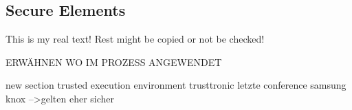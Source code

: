 \subsection{Secure Elements}\label{subsection:external-secure}
This is my real text! Rest might be copied or not be checked!


ERWÄHNEN WO IM PROZESS ANGEWENDET\newline

new section trusted execution environment
trusttronic letzte conference
samsung knox
-->gelten eher sicher
